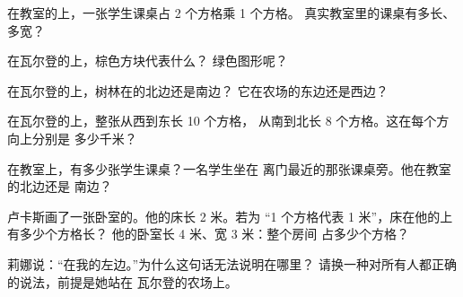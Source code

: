 \begin{exercise}[$\star$]\label{exo:g2:drawing-to-map:5}
在教室的上，一张学生课桌占 2 个方格乘 1 个方格。
真实教室里的课桌有多长、多宽？
\end{exercise}

\begin{exercise}[$\star$]\label{exo:g2:drawing-to-map:6}
在瓦尔登的上，棕色方块代表什么？
绿色图形呢？
\end{exercise}

\begin{exercise}[$\star\star$]\label{exo:g2:drawing-to-map:7}
在瓦尔登的上，树林在的北边还是南边？
它在农场的东边还是西边？
\end{exercise}

\begin{exercise}[$\star\star$]\label{exo:g2:drawing-to-map:8}
在瓦尔登的上，整张从西到东长 10 个方格，
从南到北长 8 个方格。这在每个方向上分别是
多少千米？
\end{exercise}

\begin{exercise}[$\star\star$]\label{exo:g2:drawing-to-map:9}
在教室上，有多少张学生课桌？一名学生坐在
离门最近的那张课桌旁。他在教室的北边还是
南边？
\end{exercise}

\begin{exercise}[$\star\star$]\label{exo:g2:drawing-to-map:10}
卢卡斯画了一张卧室的。他的床长 2 米。若为
“1 个方格代表 1 米”，床在他的上有多少个方格长？
他的卧室长 4 米、宽 3 米：整个房间
占多少个方格？
\end{exercise}

\begin{exercise}[$\star\star$]\label{exo:g2:drawing-to-map:11}
莉娜说：“在我的左边。”为什么这句话无法说明在哪里？
请换一种对所有人都正确的说法，前提是她站在
瓦尔登的农场上。
\end{exercise}
